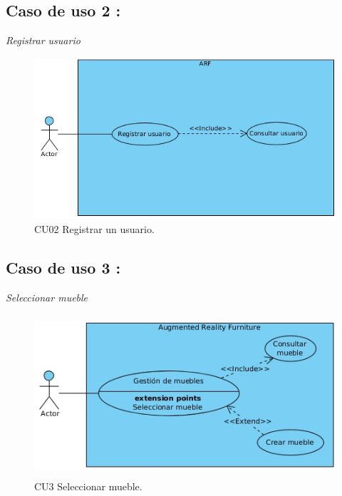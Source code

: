 \subsection{Caso de uso 2 :} \textit{Registrar usuario} 
\vspace{5mm} 	
\begin{figure}[h!]
	\centering
	\includegraphics[width=12cm,height=6cm]{imagenes/analisis/registrarUsuario.jpg}
	\caption{CU02 Registrar un usuario.}
	\label{fig:analogo}
\end{figure} 
\newpage
\subsection{Caso de uso 3 :} \textit{Seleccionar mueble} 
\vspace{5mm}
\begin{figure}[h!]
	\centering
	\includegraphics[width=12cm,height=6cm]{imagenes/analisis/seleccionarMueble.jpg}
	\caption{CU3 Seleccionar mueble.}
	\label{fig:analogo}
\end{figure}

